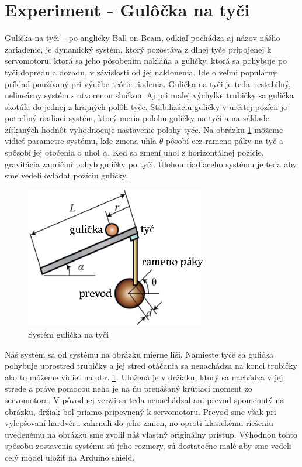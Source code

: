 \section{Experiment - Gulôčka na tyči}
\label{kap:1.2}

 Gulička na tyči – po anglicky Ball on Beam, odkiaľ pochádza aj názov nášho zariadenie, je dynamický systém, ktorý pozostáva z dlhej tyče pripojenej k servomotoru, ktorá sa jeho pôsobením nakláňa a guličky, ktorá sa pohybuje po tyči dopredu a dozadu, v závislosti od jej naklonenia. Ide o veľmi populárny príklad používaný pri výučbe teórie riadenia. Gulička na tyči je teda nestabilný, nelineárny systém s otvorenou slučkou. Aj pri malej výchylke trubičky sa gulička skotúľa do jednej z krajných polôh tyče. Stabilizáciu guličky v určitej pozícii je potrebný riadiaci systém, ktorý meria polohu guličky na tyči  a na základe získaných hodnôt vyhodnocuje nastavenie polohy tyče. Na obrázku \ref{OBRAZOK 1.2} môžeme vidieť parametre systému, kde zmena uhla  $\theta$ pôsobí cez rameno páky na tyč a spôsobí jej otočenia o uhol $\alpha$. Keď sa zmení uhol z horizontálnej pozície, gravitácia zapríčiní pohyb guličky po tyči. Úlohou riadiaceho systému je teda aby sme vedeli ovládať pozíciu guličky.


\begin{figure}[!h]
	\centering
	\includegraphics[width=80mm]{obr/experimentBOB.eps}
	\caption{Systém gulička na tyči \cite{BOBexperiment}}\label{OBRAZOK 1.2} 
\end{figure} 


Náš systém sa od systému na obrázku mierne líši. Namieste tyče sa gulička pohybuje uprostred trubičky a jej stred otáčania sa nenachádza na konci trubičky ako to môžeme vidieť na obr. \ref{OBRAZOK 1.2}. Uložená je v držiaku, ktorý sa nachádza v jej strede a práve pomocou neho je na ňu prenášaný krútiaci moment zo servomotora. V pôvodnej verzii sa teda nenachádzal ani prevod spomenutý na obrázku, držiak bol priamo pripevnený k servomotoru. Prevod sme však pri vylepšovaní hardvéru zahrnuli do jeho zmien, no oproti klasickému riešeniu uvedenému na obrázku sme zvolil náš vlastný originálny prístup. Výhodnou tohto spôsobu zostavenia systému sú jeho rozmery, sú dostatočne malé aby sme vedeli celý model uložiť na Arduino shield.


